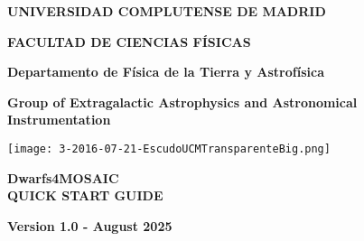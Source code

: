\begin{titlepage}
\centering
{ \bfseries \Large UNIVERSIDAD COMPLUTENSE DE MADRID}
\vspace{0.5cm}

{\bfseries  \Large FACULTAD DE CIENCIAS FÍSICAS} 
\vspace{1cm}

{\bfseries  \Large Departamento de Física de la Tierra y Astrofísica} 
\vspace{0.5cm}

{\bfseries  \Large Group of Extragalactic Astrophysics and Astronomical Instrumentation}
\vspace{0.8cm}

{\texttt{[image: 3-2016-07-21-EscudoUCMTransparenteBig.png]}} %
\vspace{2cm}

{\bfseries \Large Dwarfs4MOSAIC \\ \vspace{5mm} QUICK START GUIDE}
\vspace{8cm}

{\bfseries \large Version 1.0 - August 2025}\vspace{5mm} 

\end{titlepage}

